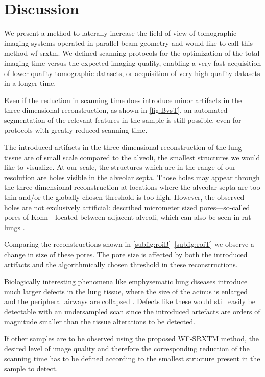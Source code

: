 \section{Discussion}\label{sec:Discussion}
We present a method to laterally increase the field of view of tomographic imaging systems operated in parallel beam geometry and would like to call this method \ac{wf-srxtm}. We defined scanning protocols for the optimization of the total imaging time versus the expected imaging quality, enabling a very fast acquisition of lower quality tomographic datasets, or acquisition of very high quality datasets in a longer time.

Even if the reduction in scanning time does introduce minor artifacts in the three-dimensional reconstruction, as shown in \autoref{fig:BvsT}, an automated segmentation of the relevant features in the sample is still possible, even for protocols with greatly reduced scanning time. 

The introduced artifacts in the three-dimensional reconstruction of the lung tissue are of small scale compared to the alveoli, the smallest structures we would like to visualize. At our scale, the structures which are in the range of our resolution are holes visible in the alveolar septa. Those holes may appear through the three-dimensional reconstruction at locations where the alveolar septa are too thin and/or the globally chosen threshold is too high. However, the observed holes are not exclusively artificial: \citet{Kohn1893} described micrometer sized pores---so-called pores of Kohn---located between adjacent alveoli, which can also be seen in rat lungs \cite{Vanmeir1991}.

Comparing the reconstructions shown in \autoref{subfig:roiB}--\ref{subfig:roiT} we observe a change in size of these pores. The pore size is affected by both the introduced artifacts and the algorithmically chosen threshold in these reconstructions.

Biologically interesting phenomena like emphysematic lung diseases introduce much larger defects in the lung tissue, where the size of the acinus is enlarged and the peripheral airways are collapsed \cite{Weibel2009}. Defects like these would still easily be detectable with an undersampled scan since the introduced artefacts are orders of magnitude smaller than the tissue alterations to be detected.

If other samples are to be observed using the proposed WF-SRXTM method, the desired level of image quality and therefore the corresponding reduction of the scanning time has to be defined according to the smallest structure present in the sample to detect.


